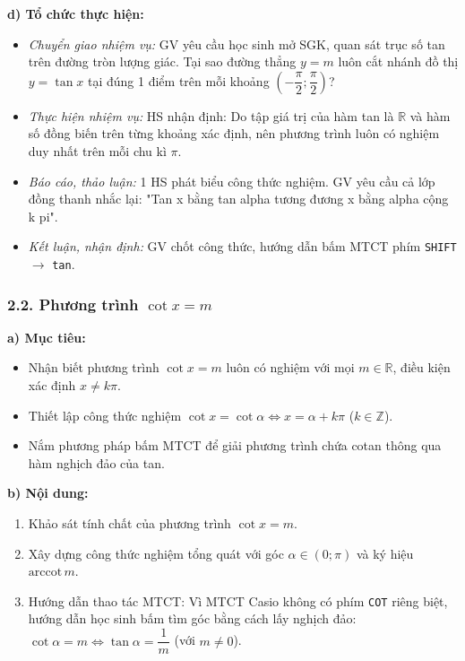\documentclass[12pt, a4paper]{article}
\begin{document}
\noindent \textbf{d) Tổ chức thực hiện:}  
\begin{itemize}[leftmargin=0.8cm]  
    \item \textit{Chuyển giao nhiệm vụ:} GV yêu cầu học sinh mở SGK, quan sát trục số tan trên đường tròn lượng giác. Tại sao đường thẳng $y = m$ luôn cắt nhánh đồ thị $y = \tan x$ tại đúng 1 điểm trên mỗi khoảng $\left(-\dfrac{\pi}{2}; \dfrac{\pi}{2}\right)$?  
    \item \textit{Thực hiện nhiệm vụ:} HS nhận định: Do tập giá trị của hàm tan là $\mathbb{R}$ và hàm số đồng biến trên từng khoảng xác định, nên phương trình luôn có nghiệm duy nhất trên mỗi chu kì $\pi$.  
    \item \textit{Báo cáo, thảo luận:} 1 HS phát biểu công thức nghiệm. GV yêu cầu cả lớp đồng thanh nhắc lại: "Tan x bằng tan alpha tương đương x bằng alpha cộng k pi".  
    \item \textit{Kết luận, nhận định:} GV chốt công thức, hướng dẫn bấm MTCT phím \texttt{SHIFT} $\to$ \texttt{tan}.  
\end{itemize}  
  
\subsubsection*{2.2. Phương trình $\cot x = m$}  
  
\noindent \textbf{a) Mục tiêu:}  
\begin{itemize}[leftmargin=0.8cm]  
    \item Nhận biết phương trình $\cot x = m$ luôn có nghiệm với mọi $m \in \mathbb{R}$, điều kiện xác định $x \neq k\pi$.  
    \item Thiết lập công thức nghiệm $\cot x = \cot\alpha \iff x = \alpha + k\pi$ ($k \in \mathbb{Z}$).  
    \item Nắm phương pháp bấm MTCT để giải phương trình chứa cotan thông qua hàm nghịch đảo của tan.  
\end{itemize}  
  
\noindent \textbf{b) Nội dung:}  
\begin{enumerate}[leftmargin=0.6cm]  
    \item Khảo sát tính chất của phương trình $\cot x = m$.  
    \item Xây dựng công thức nghiệm tổng quát với góc $\alpha \in (0; \pi)$ và ký hiệu $\text{arccot}\, m$.  
    \item Hướng dẫn thao tác MTCT: Vì MTCT Casio không có phím \texttt{COT} riêng biệt, hướng dẫn học sinh bấm tìm góc bằng cách lấy nghịch đảo: $\cot\alpha = m \iff \tan\alpha = \dfrac{1}{m}$ (với $m \neq 0$).  
\end{enumerate}  
  
\end{document}
